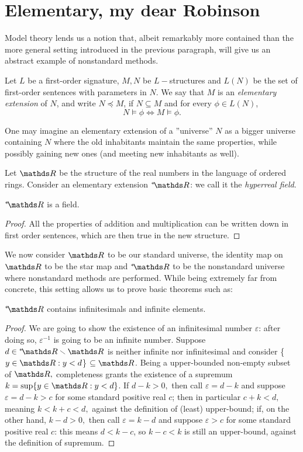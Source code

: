 \documentclass[draft.tex]{subfiles}
\begin{document}
\section{Elementary, my dear Robinson}
Model theory lends us a notion that, albeit remarkably more contained than the more general setting introduced in the previous paragraph, will give us an abstract example of nonstandard methods.
\begin{definition}
Let $L$ be a first-order signature, $M, N$ be $L-$structures and $L(N)$ be the set of first-order sentences with parameters in $N$. We say that $M$ is an \emph{elementary extension} of $N$, and write $N \preceq M$, if $N \subseteq M$ and for every $\phi \in L(N)$,
\begin{equation*}
    N \vDash \phi \iff M \vDash \phi.
\end{equation*}
\end{definition}
\label{def:elext}
One may imagine an elementary extension of a ''universe'' $N$ as a bigger universe containing $N$ where the old inhabitants maintain the same properties, while possibly gaining new ones (and meeting new inhabitants as well).
\begin{definition}
\label{def:hyperreal}
Let $\RR$ be the structure of the real numbers in the language of ordered rings. Consider an elementary extension $\ns{\RR}$: we call it the \emph{hyperreal field}.
\end{definition}
\begin{lemma}
\label{lem:field}
$\ns{\RR}$ is a field.
\end{lemma}
\begin{proof}
All the properties of addition and multiplication can be written down in first order sentences, which are then true in the new structure.
\end{proof}
We now consider $\RR$ to be our standard universe, the identity map on $\RR$ to be the star map and $\ns{\RR}$ to be the nonstandard universe where nonstandard methods are performed. While being extremely far from concrete, this setting allows us to prove basic theorems such as:
\begin{theorem}
\label{thm:exinf}
$\ns{\RR}$ contains infinitesimals and infinite elements.
\end{theorem}
\begin{proof}
We are going to show the existence of an infinitesimal number $\varepsilon$: after doing so, $\varepsilon^{-1}$ is going to be an infinite number. Suppose $d \in \ns{\RR} \sm \RR$ is neither infinite nor infinitesimal and consider \{$y \in \RR: y < d$\} $\subseteq \RR$. Being a upper-bounded non-empty subset of $\RR,$ completeness grants the existence of a supremum $k = \sup\{y \in \RR: y < d\}$. If $d-k > 0,$ then call $\varepsilon = d-k$ and suppose $\varepsilon = d-k > c$ for some standard positive real $c$; then in particular $c+k < d,$ meaning $k < k+c < d,$ against the definition of (least) upper-bound; if, on the other hand, $k-d > 0,$ then call $\varepsilon = k-d$ and suppose $\varepsilon > c$ for some standard positive real $c$: this means $d < k-c$, so $k-c < k$ is still an upper-bound, against the definition of supremum.  
\end{proof}
\end{document}
